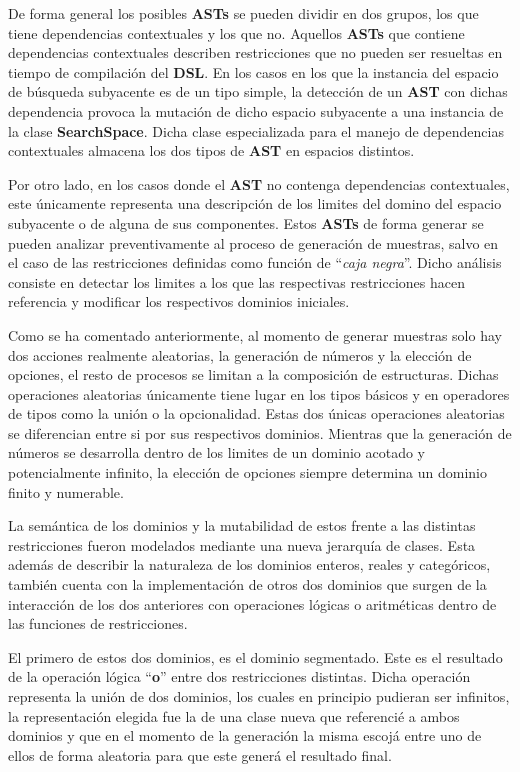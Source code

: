 De forma general los posibles {\bf ASTs} se pueden dividir en dos grupos, los que tiene dependencias contextuales
y los que no. Aquellos {\bf ASTs} que contiene dependencias contextuales describen restricciones que no pueden ser
resueltas en tiempo de compilación del {\bf DSL}. En los casos en los que la instancia del espacio de búsqueda subyacente
es de un tipo simple, la detección de un {\bf AST }con dichas dependencia provoca la mutación de dicho espacio subyacente
a una instancia de la clase {\bf SearchSpace}. Dicha clase especializada para el manejo de dependencias contextuales
almacena los dos tipos de {\bf AST} en espacios distintos.

Por otro lado, en los casos donde el {\bf AST} no contenga dependencias contextuales, este únicamente representa una
descripción de los limites del domino del espacio subyacente o de alguna de sus componentes. Estos {\bf ASTs} de forma
generar se pueden analizar preventivamente al proceso de generación de muestras, salvo en el caso de las restricciones
definidas como función de ``{\it caja negra}''. Dicho análisis consiste en detectar los limites a los que las respectivas
restricciones hacen referencia y modificar los respectivos dominios iniciales.

Como se ha comentado anteriormente, al momento de generar muestras solo hay dos acciones realmente aleatorias, la
generación de números y la elección de opciones, el resto de procesos se limitan a la composición de estructuras.
Dichas operaciones aleatorias únicamente tiene lugar en los tipos básicos y en operadores de tipos como la unión o
la opcionalidad. Estas dos únicas operaciones aleatorias se diferencian entre si por sus respectivos dominios. Mientras
que la generación de números se desarrolla dentro de los limites de un dominio acotado y potencialmente infinito, 
la elección de opciones siempre determina un dominio finito y numerable.

La semántica de los dominios y la mutabilidad de estos frente a las distintas restricciones fueron modelados mediante una
nueva jerarquía de clases. Esta además de describir la naturaleza de los dominios enteros, reales y categóricos,
también cuenta con la implementación de otros dos dominios que surgen de la interacción de los dos anteriores con operaciones
lógicas o aritméticas dentro de las funciones de restricciones.

El primero de estos dos dominios, es el dominio segmentado. Este es el resultado de la operación lógica ``{\bf o}'' entre dos
restricciones distintas. Dicha operación representa la unión de dos dominios, los cuales en principio pudieran ser
infinitos, la representación elegida fue la de una clase nueva que referencié a ambos dominios y que en el momento de la
generación la misma escojá entre uno de ellos de forma aleatoria para que este generá el resultado final.

